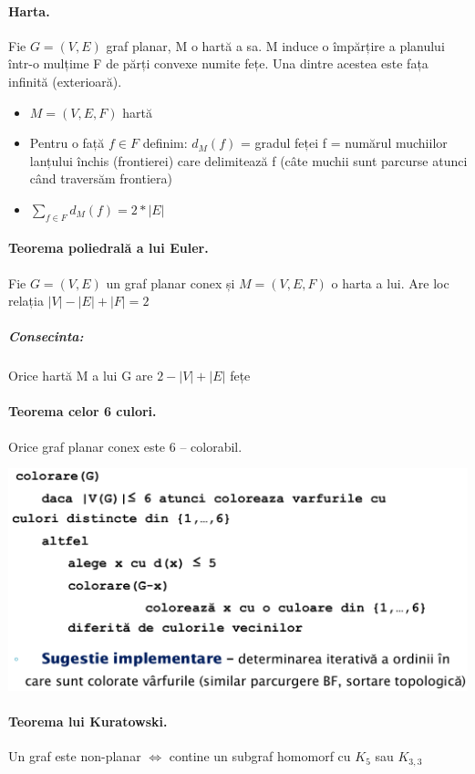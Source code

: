 \documentclass{article}
\begin{document}
\paragraph*{Harta.} Fie $G = (V, E)$ graf planar, M o hartă a sa. M induce o împărțire a planului într-o mulțime F de părți convexe numite fețe. Una dintre acestea este fața infinită (exterioară).
\begin{itemize}
    \item $M = (V, E, F)$ hartă
    \item Pentru o față $f \in F$ definim: $d_M(f)$ = gradul feței f = numărul muchiilor lanțului închis (frontierei) care delimitează f (câte muchii sunt parcurse atunci când traversăm frontiera)
    \item $\sum_{f \in F} d_M(f) = 2 * |E|$
\end{itemize}

\paragraph*{Teorema poliedrală a lui Euler.} Fie $G=(V, E)$ un graf planar conex și $M = (V, E, F)$ o harta a lui. Are loc relația $|V| - |E| + |F| = 2$
\subparagraph*{Consecinta:} Orice hartă M a lui G are $2 - |V| + |E|$ fețe
\paragraph*{Teorema celor 6 culori.} Orice graf planar conex este 6 – colorabil.
\begin{center}
    \includegraphics[scale=0.3]{14_grafplanar_6colorabil.png}
\end{center}

\paragraph*{Teorema lui Kuratowski.} Un graf este non-planar $\Leftrightarrow$ contine un subgraf homomorf cu $K_5$ sau $K_{3,3}$
\end{document}
